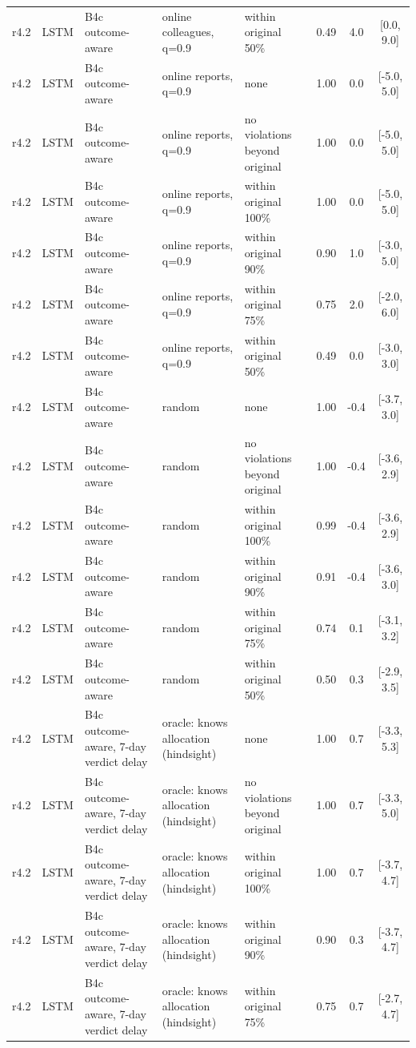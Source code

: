 \documentclass[10pt,onecolumn,letterpaper]{article}
\begin{document}
\begin{longtable}{lllp{4.2cm}p{3.4cm}ccc}
r4.2 & LSTM & B4c outcome-aware & online colleagues, q=0.9 & within original 50\% & 0.49 & 4.0 & [0.0, 9.0] \\
r4.2 & LSTM & B4c outcome-aware & online reports, q=0.9 & none & 1.00 & 0.0 & [-5.0, 5.0] \\
r4.2 & LSTM & B4c outcome-aware & online reports, q=0.9 & no violations beyond original & 1.00 & 0.0 & [-5.0, 5.0] \\
r4.2 & LSTM & B4c outcome-aware & online reports, q=0.9 & within original 100\% & 1.00 & 0.0 & [-5.0, 5.0] \\
r4.2 & LSTM & B4c outcome-aware & online reports, q=0.9 & within original 90\% & 0.90 & 1.0 & [-3.0, 5.0] \\
r4.2 & LSTM & B4c outcome-aware & online reports, q=0.9 & within original 75\% & 0.75 & 2.0 & [-2.0, 6.0] \\
r4.2 & LSTM & B4c outcome-aware & online reports, q=0.9 & within original 50\% & 0.49 & 0.0 & [-3.0, 3.0] \\
r4.2 & LSTM & B4c outcome-aware & random & none & 1.00 & -0.4 & [-3.7, 3.0] \\
r4.2 & LSTM & B4c outcome-aware & random & no violations beyond original & 1.00 & -0.4 & [-3.6, 2.9] \\
r4.2 & LSTM & B4c outcome-aware & random & within original 100\% & 0.99 & -0.4 & [-3.6, 2.9] \\
r4.2 & LSTM & B4c outcome-aware & random & within original 90\% & 0.91 & -0.4 & [-3.6, 3.0] \\
r4.2 & LSTM & B4c outcome-aware & random & within original 75\% & 0.74 & 0.1 & [-3.1, 3.2] \\
r4.2 & LSTM & B4c outcome-aware & random & within original 50\% & 0.50 & 0.3 & [-2.9, 3.5] \\
r4.2 & LSTM & B4c outcome-aware, 7-day verdict delay & oracle: knows allocation (hindsight) & none & 1.00 & 0.7 & [-3.3, 5.3] \\
r4.2 & LSTM & B4c outcome-aware, 7-day verdict delay & oracle: knows allocation (hindsight) & no violations beyond original & 1.00 & 0.7 & [-3.3, 5.0] \\
r4.2 & LSTM & B4c outcome-aware, 7-day verdict delay & oracle: knows allocation (hindsight) & within original 100\% & 1.00 & 0.7 & [-3.7, 4.7] \\
r4.2 & LSTM & B4c outcome-aware, 7-day verdict delay & oracle: knows allocation (hindsight) & within original 90\% & 0.90 & 0.3 & [-3.7, 4.7] \\
r4.2 & LSTM & B4c outcome-aware, 7-day verdict delay & oracle: knows allocation (hindsight) & within original 75\% & 0.75 & 0.7 & [-2.7, 4.7] \\

\end{longtable}
\end{document}
